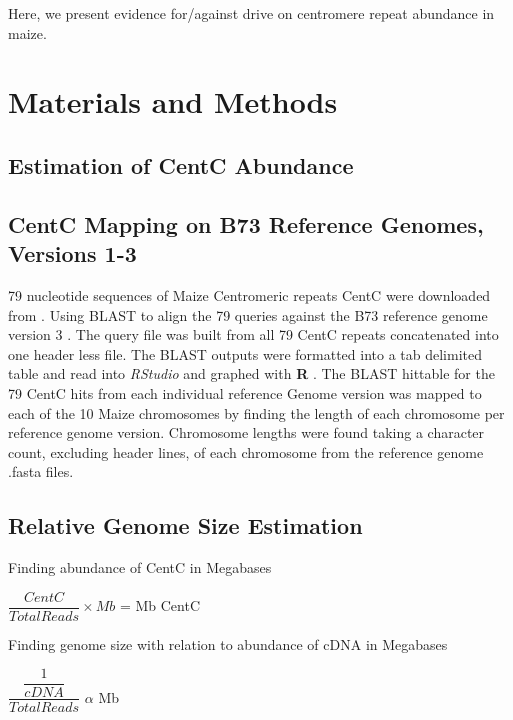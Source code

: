\documentclass[12pt]{article}
\begin{document}

Here, we present evidence for/against drive on centromere repeat abundance in maize.     

\section{Materials and Methods}

\subsection{Estimation of CentC Abundance} %

\subsection{CentC Mapping on B73 Reference Genomes, Versions 1-3} %

79 nucleotide sequences of Maize Centromeric repeats CentC were downloaded from \cite{ncbi nucleotide database}. Using BLAST to align the 79 queries against the B73 reference genome version 3 \cite{MaizeGDB} \cite{BLAST}. The query file was built from all 79 CentC repeats concatenated into one header less file. The BLAST outputs were formatted into a tab delimited table and read into \emph{RStudio} and graphed with {\bf R} \cite{R} \cite{RStudio}. The BLAST hittable for the 79 CentC hits from each individual reference Genome version was mapped to each of the 10 Maize chromosomes by finding the length of each chromosome per reference genome version. Chromosome lengths were found taking a character count, excluding header lines, of each chromosome from the reference genome .fasta files. 

\subsection{Relative Genome Size Estimation } %

Finding abundance of CentC in Megabases

$\dfrac{CentC}{Total Reads}\times Mb$ = Mb CentC	

Finding genome size with relation to abundance of cDNA in Megabases

$\dfrac{\dfrac{1}{cDNA}}{Total Reads}$ $\alpha$ Mb

\end{document}
